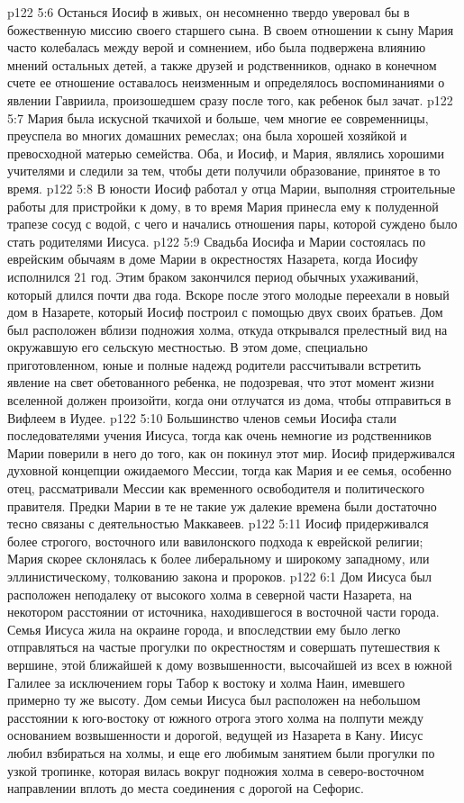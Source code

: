 \vs p122 5:6 Останься Иосиф в живых, он несомненно твердо уверовал бы в божественную миссию своего старшего сына. В своем отношении к сыну Мария часто колебалась между верой и сомнением, ибо была подвержена влиянию мнений остальных детей, а также друзей и родственников, однако в конечном счете ее отношение оставалось неизменным и определялось воспоминаниями о явлении Гавриила, произошедшем сразу после того, как ребенок был зачат.
\vs p122 5:7 Мария была искусной ткачихой и больше, чем многие ее современницы, преуспела во многих домашних ремеслах; она была хорошей хозяйкой и превосходной матерью семейства. Оба, и Иосиф, и Мария, являлись хорошими учителями и следили за тем, чтобы дети получили образование, принятое в то время.
\vs p122 5:8 \pc В юности Иосиф работал у отца Марии, выполняя строительные работы для пристройки к дому, в то время Мария принесла ему к полуденной трапезе сосуд с водой, с чего и начались отношения пары, которой суждено было стать родителями Иисуса.
\vs p122 5:9 Свадьба Иосифа и Марии состоялась по еврейским обычаям в доме Марии в окрестностях Назарета, когда Иосифу исполнился 21 год. Этим браком закончился период обычных ухаживаний, который длился почти два года. Вскоре после этого молодые переехали в новый дом в Назарете, который Иосиф построил с помощью двух своих братьев. Дом был расположен вблизи подножия холма, откуда открывался прелестный вид на окружавшую его сельскую местностью. В этом доме, специально приготовленном, юные и полные надежд родители рассчитывали встретить явление на свет обетованного ребенка, не подозревая, что этот момент жизни вселенной должен произойти, когда они отлучатся из дома, чтобы отправиться в Вифлеем в Иудее.
\vs p122 5:10 \pc Большинство членов семьи Иосифа стали последователями учения Иисуса, тогда как очень немногие из родственников Марии поверили в него до того, как он покинул этот мир. Иосиф придерживался духовной концепции ожидаемого Мессии, тогда как Мария и ее семья, особенно отец, рассматривали Мессии как временного освободителя и политического правителя. Предки Марии в те не такие уж далекие времена были достаточно тесно связаны с деятельностью Маккавеев.
\vs p122 5:11 Иосиф придерживался более строгого, восточного или вавилонского подхода к еврейской религии; Мария скорее склонялась к более либеральному и широкому западному, или эллинистическому, толкованию закона и пророков.
\vs p122 6:1 Дом Иисуса был расположен неподалеку от высокого холма в северной части Назарета, на некотором расстоянии от источника, находившегося в восточной части города. Семья Иисуса жила на окраине города, и впоследствии ему было легко отправляться на частые прогулки по окрестностям и совершать путешествия к вершине, этой ближайшей к дому возвышенности, высочайшей из всех в южной Галилее за исключением горы Табор к востоку и холма Наин, имевшего примерно ту же высоту. Дом семьи Иисуса был расположен на небольшом расстоянии к юго\hyp{}востоку от южного отрога этого холма на полпути между основанием возвышенности и дорогой, ведущей из Назарета в Кану. Иисус любил взбираться на холмы, и еще его любимым занятием были прогулки по узкой тропинке, которая вилась вокруг подножия холма в северо\hyp{}восточном направлении вплоть до места соединения с дорогой на Сефорис.
